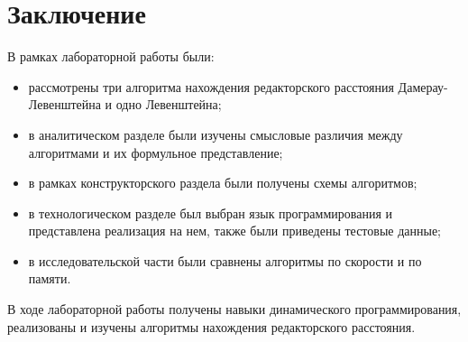\chapter*{Заключение}

В рамках лабораторной работы были:

\begin{itemize}
	\item рассмотрены три алгоритма нахождения редакторского расстояния Дамерау-Левенштейна и одно Левенштейна;
	\item в аналитическом разделе были изучены смысловые различия между алгоритмами и их формульное представление;
	\item в рамках конструкторского раздела были получены схемы алгоритмов;
	\item в технологическом разделе был выбран язык программирования и представлена реализация на нем, также были приведены тестовые данные;
	\item в исследовательской части были сравнены алгоритмы по скорости и по памяти. 
\end{itemize}

В ходе лабораторной работы получены навыки динамического программирования, реализованы и изучены алгоритмы нахождения редакторского расстояния.
